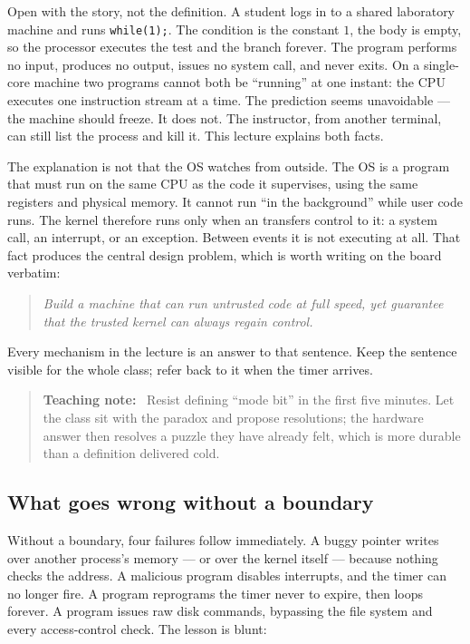 \documentclass[11pt]{article}
\newenvironment{teachingaside}{\begin{quote}\small\color{primary-gold}\textbf{Teaching note:}\ }{\end{quote}}
\begin{document}
Open with the story, not the definition. A student logs in to a shared laboratory machine and runs \texttt{while(1);}. The condition is the constant $1$, the body is empty, so the processor executes the test and the branch forever. The program performs no input, produces no output, issues no system call, and never exits. On a single-core machine two programs cannot both be ``running'' at one instant: the CPU executes one instruction stream at a time. The prediction seems unavoidable --- the machine should freeze. It does not. The instructor, from another terminal, can still list the process and kill it. This lecture explains both facts.

The explanation is not that the OS watches from outside. The OS is a program that must run on the same CPU as the code it supervises, using the same registers and physical memory. It cannot run ``in the background'' while user code runs. The kernel therefore runs only when an  transfers control to it: a system call, an interrupt, or an exception. Between events it is not executing at all. That fact produces the central design problem, which is worth writing on the board verbatim:

\begin{quote}
\itshape
Build a machine that can run untrusted code at full speed, yet guarantee that the trusted kernel can always regain control.
\end{quote}

Every mechanism in the lecture is an answer to that sentence. Keep the sentence visible for the whole class; refer back to it when the timer arrives.

\begin{teachingaside}
Resist defining ``mode bit'' in the first five minutes. Let the class sit with the paradox and propose resolutions; the hardware answer then resolves a puzzle they have already felt, which is more durable than a definition delivered cold.
\end{teachingaside}

\subsection*{What goes wrong without a boundary}

Without a boundary, four failures follow immediately. A buggy pointer writes over another process's memory --- or over the kernel itself --- because nothing checks the address. A malicious program disables interrupts, and the timer can no longer fire. A program reprograms the timer never to expire, then loops forever. A program issues raw disk commands, bypassing the file system and every access-control check. The lesson is blunt: 
\end{document}
